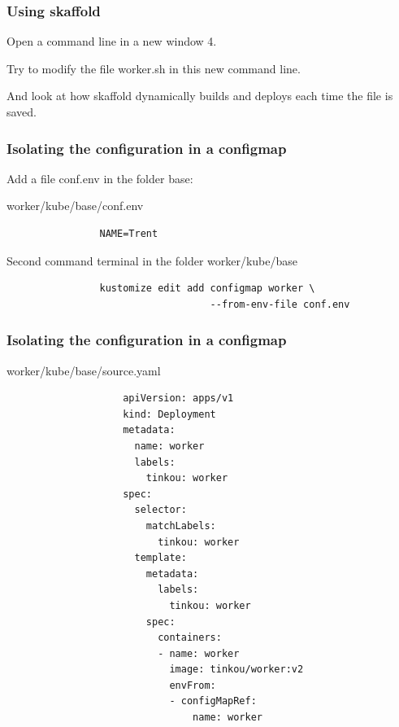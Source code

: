 	\begin{frame}
		\frametitle{Using skaffold}

		Open a command line in a new window 4.		
		
		Try to modify the file worker.sh in this new command line.
		
		\bigskip
		
		And look at how skaffold dynamically builds and deploys each time the file is saved.
	\end{frame}
	
	\begin{frame}[fragile]
		\frametitle{Isolating the configuration in a configmap}

		Add a file conf.env in the folder base:
		\begin{block}{worker/kube/base/conf.env}
			\begin{verbatim}
				NAME=Trent
			\end{verbatim}
		\end{block}				
		
		\begin{block}{Second command terminal in the folder worker/kube/base}
			\begin{verbatim}
				kustomize edit add configmap worker \
				                   --from-env-file conf.env
			\end{verbatim}
		\end{block}
	\end{frame}

	\begin{frame}[fragile]
		\frametitle{Isolating the configuration in a configmap}

		\begin{block}{worker/kube/base/source.yaml}
			\begin{tiny}
				\begin{verbatim}
					apiVersion: apps/v1
					kind: Deployment
					metadata:
					  name: worker
					  labels:
					    tinkou: worker
					spec:
					  selector:
					    matchLabels:
					      tinkou: worker
					  template:
					    metadata:
					      labels:
					        tinkou: worker
					    spec:
					      containers:
					      - name: worker
					        image: tinkou/worker:v2
					        envFrom:
					        - configMapRef:
					            name: worker
				\end{verbatim}
			\end{tiny}			
		\end{block}
	\end{frame}
	
